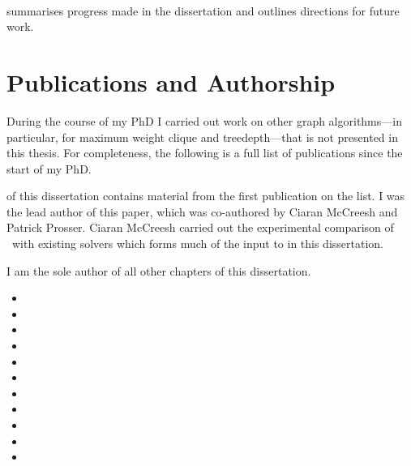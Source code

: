 \paragraph*{} summarises progress made in the dissertation
and outlines directions for future work.

\section{Publications and Authorship}

During the course of my PhD I carried out work on other graph algorithms---in particular,
for maximum weight clique and treedepth---that is not presented in this thesis.
For completeness, the following is a full list of publications
since the start of my PhD.

 of this dissertation contains material from the
first publication on the list.  I was the lead author of this paper, which was
co-authored by Ciaran McCreesh and Patrick Prosser.
Ciaran McCreesh carried out the experimental comparison of \McSplit\ with
existing solvers which forms much of the input to  in
this dissertation.

I am the sole author of all other chapters of this dissertation.

\begin{itemize}
    \item{}
    \item{}
    \item{}
    \item{}
    \item{}
    \item{}
    \item{}
    \item{}
    \item{}
    \item{}
    \item{}
\end{itemize}

